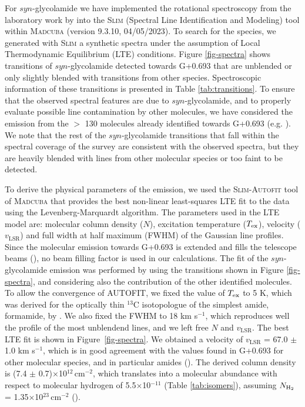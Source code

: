 \documentclass[twocolumn]{aastex63}
\begin{document}
For $syn$-glycolamide we have implemented the rotational spectroscopy from the laboratory work by \citet{sanz-novo2020} into the \textsc{Slim} (Spectral Line Identification and Modeling) tool within \textsc{Madcuba} (version 9.3.10, 04/05/2023). To search for the species, we generated with \textsc{Slim} a synthetic spectra under the assumption of Local Thermodynamic Equilibrium (LTE) conditions. Figure \ref{fig-spectra} shows transitions of $syn$-glycolamide detected towards G+0.693 that are unblended or only slightly blended with transitions from other species. Spectroscopic information of these transitions is presented in Table \ref{tab:transitions}.
To ensure that the observed spectral features are due to $syn$-glycolamide, and to properly evaluate possible line contamination by other molecules, we have considered the emission from the $>$ 130 molecules already identified towards G+0.693 (e.g. \citealt{requena-torres_organic_2006,requena-torres_largest_2008,zeng2018,Rivilla2018,rivilla2019b,rivilla2020b,rivilla2021a,rivilla2021b,rivilla2022a,rivilla2022b,rivilla2022c,jimenez-serra2020,jimenez-serra2022,bizzocchi2020,rodriguez-almeida2021a,rodriguez-almeida2021b,zeng2021,colzi2022,alberton2023,sanandres2023,zeng2023}). 
We note that the rest of the $syn$-glycolamide transitions that fall within the spectral coverage of the survey are consistent with the observed spectra, but they are heavily blended with lines from other molecular species or too faint to be detected.

To derive the physical parameters of the emission, we used the \textsc{Slim-Autofit} tool of \textsc{Madcuba} that provides the best non-linear least-squares LTE fit to the data using the Levenberg-Marquardt algorithm. The parameters used in the LTE model are: molecular column density ($N$), excitation temperature ($T_{\rm ex}$), velocity ($v_\text{LSR}$) and full width at half maximum (FWHM) of the Gaussian line profiles. 
Since the molecular emission towards G+0.693 is extended and fills the telescope beams (\citealt{requena-torres_organic_2006,requena-torres_largest_2008,zeng2018,zeng2020}), no beam filling factor is used in our calculations.
%
The fit of the $syn$-glycolamide emission was performed by using the transitions shown in Figure \ref{fig-spectra}, and considering also the contribution of the other identified molecules. 
To allow the convergence of AUTOFIT, we fixed the value of  $T_{\rm ex}$ to 5 K, which was derived for the optically thin $^{13}$C isotopologue of the simplest amide, formamide, by \citet{zeng2023}. We also fixed the FWHM to 18 km s$^{-1}$, which reproduces well the profile of the most unblendend lines, and we left free $N$ and $v_\text{LSR}$. 
The best LTE fit is shown in Figure~\ref{fig-spectra}. 
We obtained a velocity of $v_\text{LSR}$ = 67.0 $\pm$ 1.0 km s$^{-1}$, which is in good agreement with the values found in G+0.693 for other molecular species, and in particular amides (\citealt{zeng2023}). The derived column density is (7.4 $\pm$ 0.7)$\times$10$^{12}$\,cm$^{-2}$, which translates into a molecular abundance with respect to molecular hydrogen of 5.5$\times$10$^{-11}$ (Table \ref{tab:isomers}), assuming $N_{\rm H_2}$ = 1.35$\times$10$^{23}$\,cm$^{-2}$ (\citealt{martin_tracing_2008}).
\end{document}
